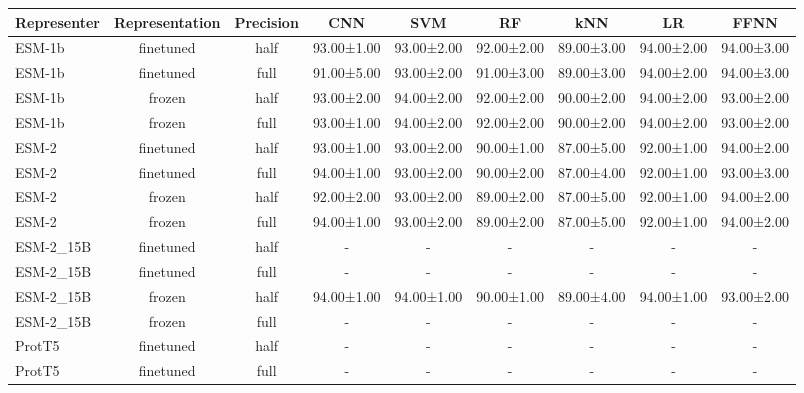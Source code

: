 \begin{tabular}{lcccccccc}
\toprule
 \textbf{Representer} & \textbf{Representation} & \textbf{Precision} &        \textbf{CNN} &        \textbf{SVM} &         \textbf{RF} &        \textbf{kNN} &         \textbf{LR} &       \textbf{FFNN} \\
\midrule
      ESM-1b &      finetuned &      half & 93.00±1.00 & 93.00±2.00 & 92.00±2.00 & 89.00±3.00 & 94.00±2.00 & 94.00±3.00 \\
      ESM-1b &      finetuned &      full & 91.00±5.00 & 93.00±2.00 & 91.00±3.00 & 89.00±3.00 & 94.00±2.00 & 94.00±3.00 \\
      ESM-1b &         frozen &      half & 93.00±2.00 & 94.00±2.00 & 92.00±2.00 & 90.00±2.00 & 94.00±2.00 & 93.00±2.00 \\
      ESM-1b &         frozen &      full & 93.00±1.00 & 94.00±2.00 & 92.00±2.00 & 90.00±2.00 & 94.00±2.00 & 93.00±2.00 \\
       ESM-2 &      finetuned &      half & 93.00±1.00 & 93.00±2.00 & 90.00±1.00 & 87.00±5.00 & 92.00±1.00 & 94.00±2.00 \\
       ESM-2 &      finetuned &      full & 94.00±1.00 & 93.00±2.00 & 90.00±2.00 & 87.00±4.00 & 92.00±1.00 & 93.00±3.00 \\
       ESM-2 &         frozen &      half & 92.00±2.00 & 93.00±2.00 & 89.00±2.00 & 87.00±5.00 & 92.00±1.00 & 94.00±2.00 \\
       ESM-2 &         frozen &      full & 94.00±1.00 & 93.00±2.00 & 89.00±2.00 & 87.00±5.00 & 92.00±1.00 & 94.00±2.00 \\
   ESM-2\_15B &      finetuned &      half &          - &          - &          - &          - &          - &          - \\
   ESM-2\_15B &      finetuned &      full &          - &          - &          - &          - &          - &          - \\
   ESM-2\_15B &         frozen &      half & 94.00±1.00 & 94.00±1.00 & 90.00±1.00 & 89.00±4.00 & 94.00±1.00 & 93.00±2.00 \\
   ESM-2\_15B &         frozen &      full &          - &          - &          - &          - &          - &          - \\
      ProtT5 &      finetuned &      half &          - &          - &          - &          - &          - &          - \\
      ProtT5 &      finetuned &      full &          - &          - &          - &          - &          - &          - \\

\end{tabular}
